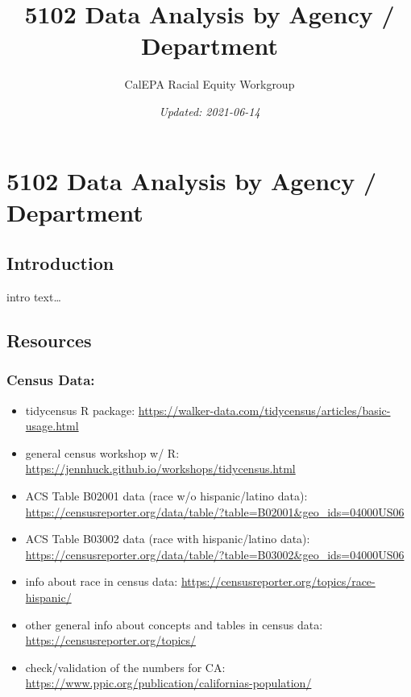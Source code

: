 \documentclass[
]{article}
\title{5102 Data Analysis by Agency / Department}
\author{CalEPA Racial Equity Workgroup}
\date{\emph{Updated: 2021-06-14}}
\begin{document}
\maketitle

{
\setcounter{tocdepth}{5}
\tableofcontents
}
\hypertarget{data-analysis-by-agency-department}{%
\section{5102 Data Analysis by Agency /
Department}\label{data-analysis-by-agency-department}}

\hypertarget{introduction}{%
\subsection{Introduction}\label{introduction}}

intro text\ldots{}

\hypertarget{resources}{%
\subsection{Resources}\label{resources}}

\hypertarget{census-data}{%
\subsubsection{Census Data:}\label{census-data}}

\begin{itemize}
\item
  tidycensus R package:
  \url{https://walker-data.com/tidycensus/articles/basic-usage.html}
\item
  general census workshop w/ R:
  \url{https://jennhuck.github.io/workshops/tidycensus.html}
\item
  ACS Table B02001 data (race w/o hispanic/latino data):
  \url{https://censusreporter.org/data/table/?table=B02001\&geo_ids=04000US06}
\item
  ACS Table B03002 data (race with hispanic/latino data):
  \url{https://censusreporter.org/data/table/?table=B03002\&geo_ids=04000US06}
\item
  info about race in census data:
  \url{https://censusreporter.org/topics/race-hispanic/}
\item
  other general info about concepts and tables in census data:
  \url{https://censusreporter.org/topics/}
\item
  check/validation of the numbers for CA:
  \url{https://www.ppic.org/publication/californias-population/}
\end{itemize}
\end{document}
